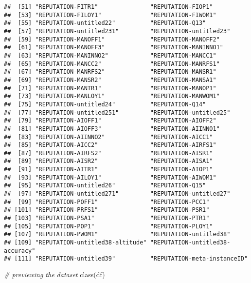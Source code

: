 \documentclass[
]{article}
\newenvironment{Shaded}{\begin{snugshade}}{\end{snugshade}}
\newcommand{\CommentTok}[1]{\textcolor[rgb]{0.56,0.35,0.01}{\textit{#1}}}
\newcommand{\FunctionTok}[1]{\textcolor[rgb]{0.00,0.00,0.00}{#1}}
\newcommand{\NormalTok}[1]{#1}
\begin{document}
\begin{verbatim}
##  [51] "REPUTATION-FITR1"               "REPUTATION-FIOP1"              
##  [53] "REPUTATION-FILOY1"              "REPUTATION-FIWOM1"             
##  [55] "REPUTATION-untitled22"          "REPUTATION-Q13"                
##  [57] "REPUTATION-untitled231"         "REPUTATION-untitled23"         
##  [59] "REPUTATION-MANOFF1"             "REPUTATION-MANOFF2"            
##  [61] "REPUTATION-MANOFF3"             "REPUTATION-MANINNO1"           
##  [63] "REPUTATION-MANINNO2"            "REPUTATION-MANCC1"             
##  [65] "REPUTATION-MANCC2"              "REPUTATION-MANRFS1"            
##  [67] "REPUTATION-MANRFS2"             "REPUTATION-MANSR1"             
##  [69] "REPUTATION-MANSR2"              "REPUTATION-MANSA1"             
##  [71] "REPUTATION-MANTR1"              "REPUTATION-MANOP1"             
##  [73] "REPUTATION-MANLOY1"             "REPUTATION-MANWOM1"            
##  [75] "REPUTATION-untitled24"          "REPUTATION-Q14"                
##  [77] "REPUTATION-untitled251"         "REPUTATION-untitled25"         
##  [79] "REPUTATION-AIOFF1"              "REPUTATION-AIOFF2"             
##  [81] "REPUTATION-AIOFF3"              "REPUTATION-AIINNO1"            
##  [83] "REPUTATION-AIINNO2"             "REPUTATION-AICC1"              
##  [85] "REPUTATION-AICC2"               "REPUTATION-AIRFS1"             
##  [87] "REPUTATION-AIRFS2"              "REPUTATION-AISR1"              
##  [89] "REPUTATION-AISR2"               "REPUTATION-AISA1"              
##  [91] "REPUTATION-AITR1"               "REPUTATION-AIOP1"              
##  [93] "REPUTATION-AILOY1"              "REPUTATION-AIWOM1"             
##  [95] "REPUTATION-untitled26"          "REPUTATION-Q15"                
##  [97] "REPUTATION-untitled271"         "REPUTATION-untitled27"         
##  [99] "REPUTATION-POFF1"               "REPUTATION-PCC1"               
## [101] "REPUTATION-PRFS1"               "REPUTATION-PSR1"               
## [103] "REPUTATION-PSA1"                "REPUTATION-PTR1"               
## [105] "REPUTATION-POP1"                "REPUTATION-PLOY1"              
## [107] "REPUTATION-PWOM1"               "REPUTATION-untitled38"         
## [109] "REPUTATION-untitled38-altitude" "REPUTATION-untitled38-accuracy"
## [111] "REPUTATION-untitled39"          "REPUTATION-meta-instanceID"
\end{verbatim}

\begin{Shaded}
\begin{Highlighting}[]
\CommentTok{\# previewing the dataset}
\FunctionTok{class}\NormalTok{(df)}
\end{Highlighting}
\end{Shaded}
\end{document}
